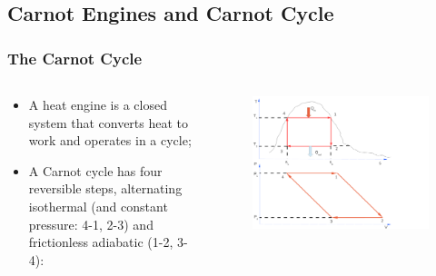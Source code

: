 \documentclass[10pt,compress,handout,ignorenonframetext]{beamer}
\begin{document}
\subsection{Carnot Engines and Carnot Cycle}

\begin{frame}
 \frametitle{The Carnot Cycle}
  \begin{columns}
   \begin{column}[c]{0.5\linewidth}
    \begin{itemize} 
     \item <1-> A heat engine is a closed system that converts heat to work and operates in a cycle;
     \item <2-> A Carnot cycle has four reversible steps, alternating isothermal (and constant pressure: 4-1, 2-3) and frictionless adiabatic (1-2, 3-4):
    \end{itemize} 

   \end{column}
   \begin{column}[c]{0.5\linewidth}
   \begin{figure}%
    \begin{center}
     \includegraphics[width=8.cm,clip]{./Pics/Carnot_PV_TS}
    \end{center}
   \end{figure}    

   \end{column}
  \end{columns}
 \normalsize
\end{frame}
\end{document}
